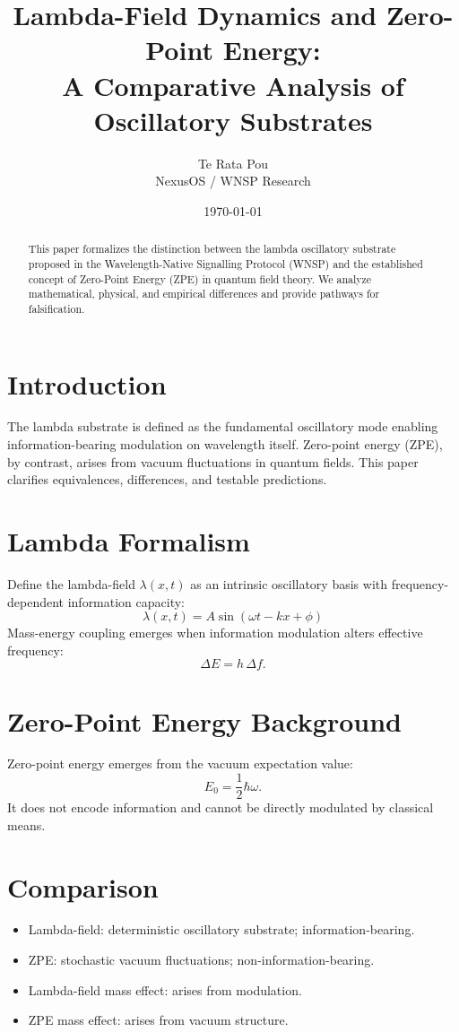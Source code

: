 \documentclass[11pt]{article}
\title{Lambda-Field Dynamics and Zero-Point Energy:\\
A Comparative Analysis of Oscillatory Substrates}
\author{Te Rata Pou \\ NexusOS / WNSP Research}
\date{\today}
\begin{document}
\maketitle

\begin{abstract}
This paper formalizes the distinction between the lambda oscillatory substrate proposed in the Wavelength-Native Signalling Protocol (WNSP) and the established concept of Zero-Point Energy (ZPE) in quantum field theory. We analyze mathematical, physical, and empirical differences and provide pathways for falsification.
\end{abstract}

\section{Introduction}
The lambda substrate is defined as the fundamental oscillatory mode enabling information-bearing modulation on wavelength itself. Zero-point energy (ZPE), by contrast, arises from vacuum fluctuations in quantum fields. This paper clarifies equivalences, differences, and testable predictions.

\section{Lambda Formalism}
Define the lambda-field $\lambda(x,t)$ as an intrinsic oscillatory basis with frequency-dependent information capacity:
\begin{equation}
\lambda(x,t)=A \sin(\omega t - kx + \phi)
\end{equation}
Mass-energy coupling emerges when information modulation alters effective frequency:
\begin{equation}
\Delta E = h \, \Delta f.
\end{equation}

\section{Zero-Point Energy Background}
Zero-point energy emerges from the vacuum expectation value:
\begin{equation}
E_0 = \frac{1}{2}\hbar\omega.
\end{equation}
It does not encode information and cannot be directly modulated by classical means.

\section{Comparison}
\begin{itemize}
\item Lambda-field: deterministic oscillatory substrate; information-bearing.
\item ZPE: stochastic vacuum fluctuations; non-information-bearing.
\item Lambda-field mass effect: arises from modulation.
\item ZPE mass effect: arises from vacuum structure.
\end{itemize}
\end{document}
